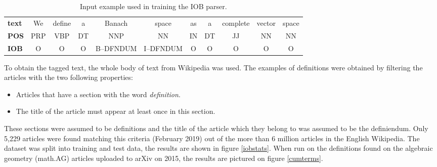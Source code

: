 \documentclass[a4paper]{easychair}
\begin{document}
\begin{table}[h]
    \begin{center}
        {\scriptsize
        \begin{tabular}{lcccccccccc}
        \hline
            \textbf{text} &We & define & a & Banach & space & as & a & complete & vector & space \\
            \textbf{POS}&PRP & VBP & DT & NNP & NN & IN & DT & JJ & NN & NN\\
            \textbf{IOB} & O& O& O& B--DFNDUM & I--DFNDUM & O& O& O& O& O \\
         \hline
    \end{tabular}
        \caption{\label{iobtags} Input example used in  training the IOB parser.}}
    \end{center} 
\end{table}

To obtain the tagged text, the whole body of text from Wikipedia was used. The examples of definitions were obtained by filtering the articles with the two following properties:
\begin{itemize}
    \item Articles that have a section with the word \textit{definition}.
    \item The title of the article must appear at least once in this section.
\end{itemize}
These sections were assumed to be definitions and the title of the article which they belong to was assumed to be the definiendum.  Only 5,229 articles were found matching this criteria (February 2019) out of the more than 6 million articles in the English Wikipedia. The dataset was split into training and test data, the results are shown in figure \ref{iobstats}. When run on the definitions found on the algebraic geometry (math.AG) articles uploaded to arXiv on 2015, the results are pictured on figure \ref{cumterms}.
\end{document}
